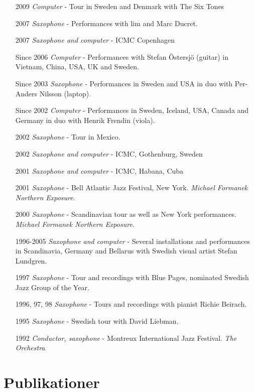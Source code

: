 \documentclass[a4paper]{article}
\begin{document}
\begin{enumerate}
\item [2009] \emph{Computer} - Tour in Sweden and Denmark with The Six Tones
\item [2007] \emph{Saxophone} - Performances with lim and Marc Ducret. 
\item [2007] \emph{Saxophone and computer} - ICMC Copenhagen
 \item[Since 2006] \emph{Computer} - Performances with Stefan \"Ostersj\"o (guitar) in Vietnam, China, USA, UK and Sweden.
 \item[Since 2003] \emph{Saxophone} - Performances in Sweden and USA in duo with Per-Anders
 Nilsson (laptop).
 \item[Since 2002] \emph{Computer} - Performances in Sweden, Iceland,
 USA, Canada and Germany in duo with Henrik Frendin (viola).
 \item[2002] \emph{Saxophone} - Tour in Mexico.
 \item[2002] \emph{Saxophone and computer} - ICMC, Gothenburg, Sweden
 \item[2001] \emph{Saxophone and computer} - ICMC, Habana, Cuba
 \item[2001] \emph{Saxophone} - Bell Atlantic Jazz Festival, New York. \emph{Michael Formanek
 Northern Exposure}.
 \item[2000] \emph{Saxophone} - Scandinavian tour as well as New York
 performances. \emph{Michael Formanek Northern Exposure}.
 \item[1996-2005] \emph{Saxophone and computer} - Several installations and performances in Scandinavia,
 Germany and Bellarus with Swedish visual artist Stefan Lundgren.
 \item[1997] \emph{Saxophone} - Tour and recordings with Blue Pages, nominated Swedish Jazz
 Group of the Year.
 \item[1996, 97, 98] \emph{Saxophone} - Tours and recordings with pianist Richie Beirach.
 \item[1995] \emph{Saxophone} - Swedish tour with David Liebman.
 \item[1992] \emph{Conductor, saxophone} - Montreux International Jazz Festival. \emph{The Orchestra}
\end{enumerate}

\section{Publikationer}
\end{document}
